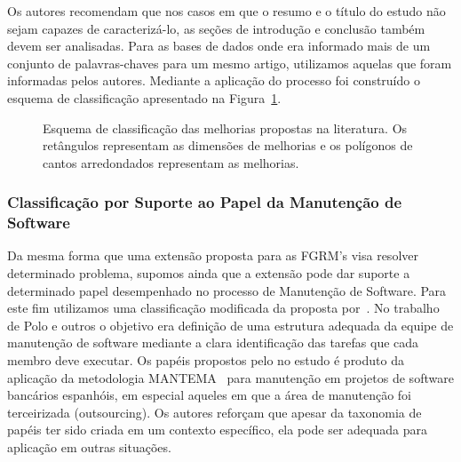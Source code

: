 Os autores recomendam que nos casos em que o resumo e o título do estudo não
sejam capazes de caracterizá-lo, as seções de introdução e conclusão também
devem ser analisadas. Para as bases de dados onde era informado mais de um
conjunto de palavras-chaves para um mesmo artigo, utilizamos aquelas que foram
informadas pelos autores. Mediante a aplicação do processo foi construído o
esquema de classificação apresentado na
Figura~\ref{fig:diagrama-esquema-dimensao-melhorias}.

\begin{figure}[tb]
\centering
\caption{Esquema de classificação das melhorias propostas na literatura. Os
	retângulos representam as dimensões de melhorias e os polígonos de cantos
	arredondados representam as melhorias.}
\label{fig:diagrama-esquema-dimensao-melhorias}
\end{figure}


\subsubsection{Classificação por Suporte ao Papel da Manutenção de Software}
\label{subsubsec:map-esquema-suporte-papel-man}

Da mesma forma que uma extensão proposta para as FGRM's visa resolver
determinado problema, supomos ainda que a extensão pode dar suporte a
determinado papel desempenhado no processo de Manutenção de Software. Para este
fim utilizamos uma classificação modificada da proposta por~\cite{Polo1999}. No
trabalho de Polo e outros o objetivo era definição de uma estrutura adequada da
equipe de manutenção de software mediante a clara identificação das tarefas que
cada membro deve executar. Os papéis propostos pelo no estudo é produto da
aplicação da metodologia MANTEMA~\cite{756695} para manutenção em projetos de
software bancários espanhóis, em especial aqueles em que a área de manutenção
foi terceirizada (outsourcing). Os autores reforçam que apesar da taxonomia de
papéis ter sido criada em um contexto específico, ela pode ser adequada para
aplicação em outras situações.

